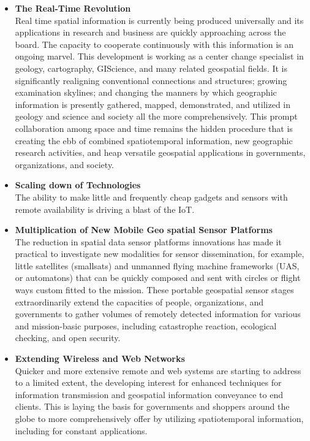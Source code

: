 \begin{itemize}
  \item \textbf{The Real-Time Revolution} \\
 Real time spatial information is currently being produced universally and its applications in research and business are quickly approaching across the board. The capacity to cooperate continuously with this information is an ongoing marvel. This development is working as a center change specialist in geology, cartography, GIScience, and many related geospatial fields. It is significantly realigning conventional connections and structures; growing examination skylines; and changing the manners by which geographic information is presently gathered, mapped, demonstrated, and utilized in geology and science and society all the more comprehensively. This prompt collaboration among space and time remains the hidden procedure that is creating the ebb of combined spatiotemporal information, new geographic research activities, and heap versatile geospatial applications in governments, organizations, and society. 
  
  \item  \textbf{Scaling down of Technologies} \\
 The ability to make little and frequently cheap gadgets and sensors with remote availability is driving a blast of the \gls{IoT}.
  
  \item  \textbf{Multiplication of New Mobile Geo spatial Sensor Platforms} \\
  The reduction in spatial data sensor platforms innovations has made it practical to investigate new modalities for sensor dissemination, for example, little satellites (smallsats) and unmanned flying machine frameworks (UAS, or automatons) that can be quickly composed and sent with circles or flight ways custom fitted to the mission. These portable geospatial sensor stages extraordinarily extend the capacities of people, organizations, and governments to gather volumes of remotely detected information for various and mission-basic purposes, including catastrophe reaction, ecological checking, and open security. 
  
  \item  \textbf{Extending Wireless and Web Networks} \\
 Quicker and more extensive remote and web systems are starting to address to a limited extent, the developing interest for enhanced techniques for information transmission and geospatial information conveyance to end clients. This is laying the basis for governments and shoppers around the globe to more comprehensively offer by utilizing spatiotemporal information, including for constant applications. 
  

\end{itemize}
